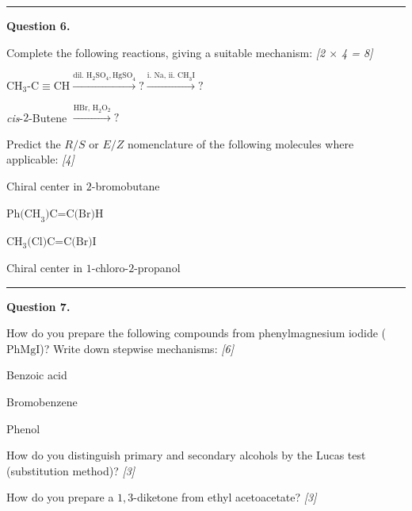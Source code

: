 \documentclass[11pt,a4paper]{article}
\newcommand{\pts}[1]{\hfill   \textit{[#1]}}
\begin{document}
\medskip\rule{\linewidth}{0.2pt}




\noindent   \textbf{Question 6.}

\begin{parts}
  \item Complete the following reactions, giving a suitable mechanism: \pts{2 $ \times$ 4 = 8}
  
\begin{parts}
    \item $ \text{CH}_3 \text{-C}\equiv \text{CH} \xrightarrow{ \text{dil. H}_2 \text{SO}_4,  \text{HgSO}_4} ? \xrightarrow{ \text{i. Na, ii. CH}_3 \text{I}} ?$
    \item   \textit{cis}-$2$-Butene $\xrightarrow{ \text{HBr, H}_2 \text{O}_2} ?$
  \end{parts}
  \item Predict the $R/S$ or $E/Z$ nomenclature of the following molecules where applicable: \pts{4}
  
\begin{parts}
    \item Chiral center in $2$-bromobutane
    \item $ \text{Ph(CH}_3 \text{)C=C(Br)H}$
    \item $ \text{CH}_3 \text{(Cl)C=C(Br)I}$
    \item Chiral center in $1$-chloro-$2$-propanol
  \end{parts}
\end{parts}

\medskip\rule{\linewidth}{0.2pt}




\noindent   \textbf{Question 7.}

\begin{parts}
  \item How do you prepare the following compounds from phenylmagnesium iodide ($ \text{PhMgI}$)? Write down stepwise mechanisms: \pts{6}
  
\begin{parts}
    \item Benzoic acid
    \item Bromobenzene
    \item Phenol
  \end{parts}
  \item How do you distinguish primary and secondary alcohols by the Lucas test (substitution method)? \pts{3}
  \item How do you prepare a $1,3$-diketone from ethyl acetoacetate? \pts{3}
\end{parts}
\end{document}
